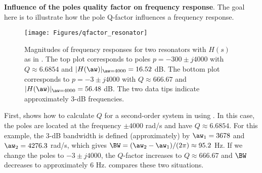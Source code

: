 %


\bApplication \textbf{Influence of the poles quality factor on frequency response}.
\label{app:poleQFactor}
The goal here is to illustrate how the pole Q-factor influences a frequency response.

\begin{figure}
\centering
\texttt{[image: Figures/qfactor\_resonator]}
\caption[{Magnitudes of frequency responses for two resonators with $H(s)$ as in .}]{Magnitudes of frequency responses for two resonators with $H(s)$ as in . The top plot corresponds to poles $p=-300 \pm j4000$ with $Q\approx 6.6854$ and $|H(\aw)|_{\aw=4000}=16.52$ dB. The bottom plot corresponds to $p=-3 \pm j4000$ with $Q\approx 666.67$ and $|H(\aw)|_{\aw=4000}=56.48$ dB. The two data tips indicate approximately 3-dB frequencies.\label{fig:qfactor_resonator}}
\end{figure}

First,  shows how to calculate $Q$ for a second-order system in {\matlab} using .
In this case, the poles are located at the frequency $\pm 4000$ rad/s and have $Q \approx 6.6854$.
For this example, the 3-dB bandwidth is defined (approximately) by $\aw_1 = 3678$ and $\aw_2 = 4276.3$ rad/s, which gives $\BW=(\aw_2-\aw_1)/(2\pi) \approx 95.2$ Hz. If we change the poles to $-3 \pm j4000$, the $Q$-factor increases to $Q \approx 666.67$ and $\BW$ decreases to approximately 6 Hz.  compares these two situations.

